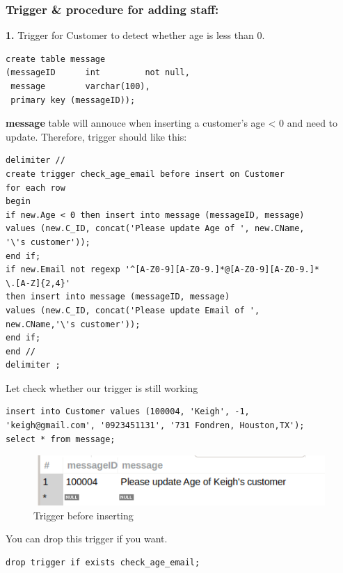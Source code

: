 \documentclass[12pt,a4paper]{article}
\begin{document}
\subsubsection{Trigger & procedure for adding staff:}
\indent \textbf{1.} Trigger for Customer to detect whether age is less than 0.
\begin{verbatim}
create table message 
(messageID      int         not null,
 message        varchar(100),
 primary key (messageID));
\end{verbatim}

\indent \textbf{message} table will annouce when inserting a customer's age < 0 and need to update. Therefore, trigger should like this:
\begin{verbatim}
delimiter //
create trigger check_age_email before insert on Customer
for each row 
begin 
if new.Age < 0 then insert into message (messageID, message)
values (new.C_ID, concat('Please update Age of ', new.CName,
'\'s customer'));
end if;
if new.Email not regexp '^[A-Z0-9][A-Z0-9.]*@[A-Z0-9][A-Z0-9.]*
\.[A-Z]{2,4}' 
then insert into message (messageID, message)
values (new.C_ID, concat('Please update Email of ', 
new.CName,'\'s customer'));
end if;
end //
delimiter ;
\end{verbatim}
\indent Let check whether our trigger is still working
\begin{verbatim}
insert into Customer values (100004, 'Keigh', -1, 
'keigh@gmail.com', '0923451131', '731 Fondren, Houston,TX');
select * from message;
\end{verbatim}


\begin{figure}[H]
    \centering
    \includegraphics[width=5in,height=0.75in]{Picture/data4.png}
    \caption{Trigger before inserting}
\end{figure}

\indent You can drop this trigger if you want.
\begin{verbatim}
drop trigger if exists check_age_email;
\end{verbatim}
\end{document}
